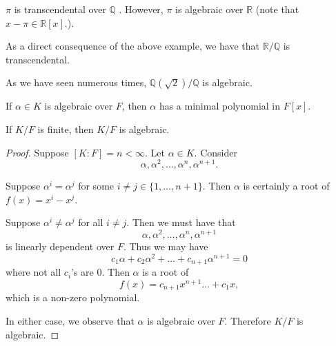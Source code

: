 \documentclass[notoc,notitlepage,nobib]{tufte-book}
\begin{document}
\begin{eg}
  $\pi$ is transcendental over $\mathbb{Q}$ . However, $\pi$ is algebraic over $\mathbb{R}$ (note that $x - \pi \in \mathbb{R}[x]$.).
\end{eg}

\begin{eg}
  As a direct consequence of the above example, we have that $\mathbb{R}/\mathbb{Q}$ is transcendental.
\end{eg}

\begin{eg}
  As we have seen numerous times, $\mathbb{Q}(\sqrt{2}) / \mathbb{Q}$ is algebraic.
\end{eg}

\begin{remark}
  If $\alpha \in K$ is algebraic over $F$, then $\alpha$ has a minimal polynomial in $F[x]$.
\end{remark}

\begin{thm}\label{thm:finite_extensions_are_algebraic}
  If $K / F$ is finite, then $K / F$ is algebraic.
\end{thm}

\begin{proof}
  Suppose $[K : F] = n < \infty$. Let $\alpha \in K$. Consider
  \begin{equation*}
    \alpha, \alpha^2, \ldots, \alpha^n, \alpha^{n + 1}.
  \end{equation*}

  \noindent
   Suppose $\alpha^i = \alpha^j$ for some $i \neq j \in \{ 1, \ldots, n + 1\}$. Then
  $\alpha$ is certainly a root of $f(x) = x^i - x^j$.

  \noindent
   Suppose $\alpha^i \neq \alpha^j$ for all $i \neq j$. Then we must have that
  \begin{equation*}
    \alpha, \alpha^2, \ldots, \alpha^n, \alpha^{n + 1}
  \end{equation*}
  is linearly dependent over $F$. Thus we may have
  \begin{equation*}
    c_1 \alpha + c_2 \alpha^2 + \hdots + c_{n + 1} \alpha^{n + 1} = 0
  \end{equation*}
  where not all $c_i$'s are $0$. Then $\alpha$ is a root of
  \begin{equation*}
    f(x) = c_{ n + 1 } x^{n + 1} \hdots + c_1 x,
  \end{equation*}
  which is a non-zero polynomial.

  In either case, we observe that $\alpha$ is algebraic over $F$. Therefore $K / F$ is algebraic.
\end{proof}
\end{document}
